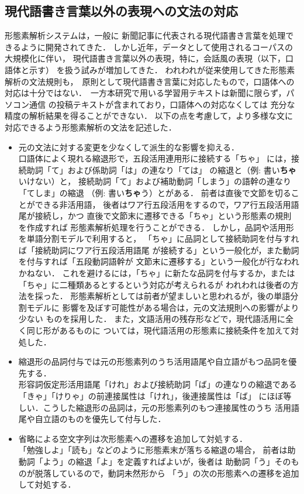 \subsection{現代語書き言葉以外の表現への文法の対応}
形態素解析システムは，一般に
新聞記事に代表される現代語書き言葉を処理できるように開発されてきた．
しかし近年，データとして使用されるコーパスの大規模化に伴い，
現代語書き言葉以外の表現，特に，会話風の表現（以下，口語体と示す）
を扱う試みが増加してきた\cite{KURO}．
われわれが従来使用してきた形態素解析の\mbox{文法規則\cite{MARUYAMA}}\mbox{も，
原則として}現代語書き言葉に対応したもので，\mbox{口語体への対応は十分ではない．
一方本研}究で用いる学習用テキストは新聞に限らず，パソコン通信
の投稿テキストが含まれており，口語体への対応なくしては
充分な精度の解析結果を得ることができない．
以下の点を考慮して，より多様な文に対応できるよう形態素解析の文法を記述した．
\begin{itemize}
\item 元の文法に対する変更を少なくして派生的な影響を抑える．\\
口語体によく現れる縮退形で，五段活用連用形に接続する「ちゃ」
には，接続助詞「て」および係助詞「は」の連なり「ては」
の縮退と（例: 書い{\bf ちゃ}いけない）と，
接続助詞「て」および補助動詞「しまう」の語幹の連なり「てしま」の縮退
（例: 書い{\bf ちゃ}う）とがある．
前者は直後で文節を切ることができる非活用語，
後者はワア行五段活用をするので，ワア行五段活用語尾が接続し，かつ
直後で文節末に遷移できる「ちゃ」という形態素の規則を作成すれば
形態素解析処理を行うことができる\cite{KURO}．
しかし，品詞や活用形を単語分割モデルで利用すると，
「ちゃ」に品詞として接続助詞を付与すれば「接続助詞にワア行五段活用語尾
が接続する」という一般化が，また動詞を付与すれば「五段動詞語幹が
文節末に遷移する」という一般化が行なわれかねない．
これを避けるには，「ちゃ」に新たな品詞を付与するか，または
「ちゃ」に二種類あるとするという対応が考えられるが
われわれは後者の方法を採った．
形態素解析としては前者が望ましいと思われるが，後の単語分割モデルに
影響を及ぼす可能性がある場合は，元の文法規則への影響がより少ない
ものを採用した．
また，文語活用の残存形などで，現代語活用に全く同じ形があるものに
ついては，現代語活用の形態素に接続条件を加えて対処した．
\item 縮退形の品詞付与では元の形態素列のうち活用語尾や自立語がもつ品詞を優先する． \\
形容詞仮定形活用語尾「けれ」および接続助詞「ば」の連なりの縮退である
「きゃ」「けりゃ」の前連接属性は「けれ」，後連接属性は「ば」
にほぼ等しい．こうした縮退形の品詞は，元の形態素列のもつ連接属性のうち
活用語尾や自立語のものを優先して付与した\cite{OGINO}．
\item 省略による空文字列は次形態素への遷移を追加して対処する．\\
「勉強しよ」「読も」などのように形態素末が落ちる縮退の場合，
前者は助動詞「よう」の縮退「よ」を定義すればよいが，後者は
助動詞「う」そのものが脱落しているので，動詞未然形から
「う」の次の形態素への遷移を追加して対処する．
\end{itemize}
